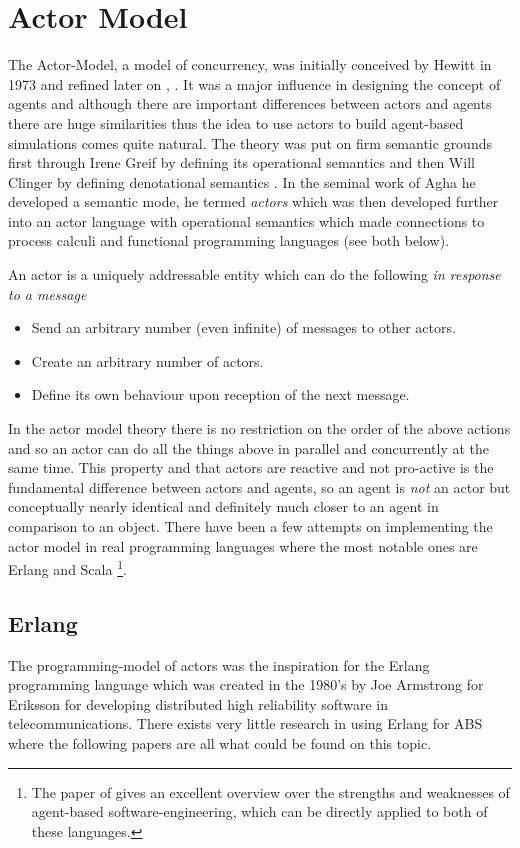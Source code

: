 \section{Actor Model}
The Actor-Model, a model of concurrency, was initially conceived by Hewitt in 1973 \cite{hewitt_universal_1973} and refined later on \cite{hewitt_what_2007}, \cite{hewitt_actor_2010}. It was a major influence in designing the concept of agents and although there are important differences between actors and agents there are huge similarities thus the idea to use actors to build agent-based simulations comes quite natural. The theory was put on firm semantic grounds first through Irene Greif by defining its operational semantics \cite{grief_semantics_1975} and then Will Clinger by defining denotational semantics \cite{clinger_foundations_1981}. In the seminal work of Agha \cite{agha_actors:_1986} he developed a semantic mode, he termed \textit{actors} which was then developed further \cite{agha_foundation_1997} into an actor language with operational semantics which made connections to process calculi and functional programming languages (see both below). 

An actor is a uniquely addressable entity which can do the following \textit{in response to a message}
\begin{itemize}
	\item Send an arbitrary number (even infinite) of messages to other actors.
	\item Create an arbitrary number of actors.
	\item Define its own behaviour upon reception of the next message.
\end{itemize}

In the actor model theory there is no restriction on the order of the above actions and so an actor can do all the things above in parallel and concurrently at the same time. This property and that actors are reactive and not pro-active is the fundamental difference between actors and agents, so an agent is \textit{not} an actor but conceptually nearly identical and definitely much closer to an agent in comparison to an object. There have been a few attempts on implementing the actor model in real programming languages where the most notable ones are Erlang and Scala \footnote{The paper of \cite{jennings_agent-based_2000} gives an excellent overview over the strengths and weaknesses of agent-based software-engineering, which can be directly applied to both of these languages.}.

\subsection{Erlang}
The programming-model of actors \cite{agha_actors:_1986} was the inspiration for the Erlang programming language \cite{armstrong_erlang_2010} which was created in the 1980's by Joe Armstrong for Eriksson for developing distributed high reliability software in telecommunications. There exists very little research in using Erlang for ABS where the following papers are all what could be found on this topic.

